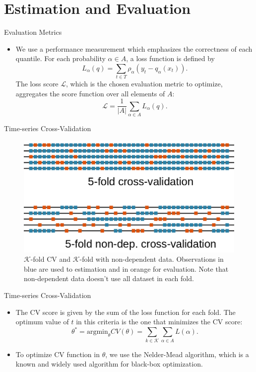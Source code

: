 \section{Estimation and Evaluation}\label{estimation-and-evaluation}

\begin{frame}{Evaluation Metrics}

\begin{itemize}
\tightlist
\item
  We use a performance measurement which emphasizes the correctness of
  each quantile. For each probability \(\alpha \in A\), a loss function
  is defined by
  \[L_\alpha(q)= \sum_{t\in T}\rho_{\alpha}(y_{t}-q_{\alpha}(x_t)).\]
  The loss score \(\mathcal{L}\), which is the chosen evaluation metric
  to optimize, aggregates the score function over all elements of \(A\):
  \[\mathcal{L}= \frac{1}{|A|}\sum_{\alpha \in A}L_\alpha(q).\]
\end{itemize}

\end{frame}

\begin{frame}{Time-series Cross-Validation}

\begin{figure}
    \centering
    \includegraphics[width=0.9\linewidth]{Imagens/Cross-validation-scheme}
    \caption{$\mathcal{K}$-fold CV and $\mathcal{K}$-fold with non-dependent data. Observations in blue are used to estimation and in orange for evaluation. Note that non-dependent data doesn't use all dataset in each fold.}
    \label{fig:cross-validation-scheme}
\end{figure}

\end{frame}

\begin{frame}{Time-series Cross-Validation}

\begin{itemize}
\tightlist
\item
  The CV score is given by the sum of the loss function for each fold.
  The optimum value of \(t\) in this criteria is the one that minimizes
  the CV score: \[
  \theta^* = \text{argmin}_\theta CV(\theta) = \sum_{k \in \mathcal{K}} \sum_{\alpha \in A} L(\alpha).
  \]
\item
  To optimize CV function in \(\theta\), we use the Nelder-Mead
  algorithm, which is a known and widely used algorithm for black-box
  optimization.
\end{itemize}

\end{frame}

